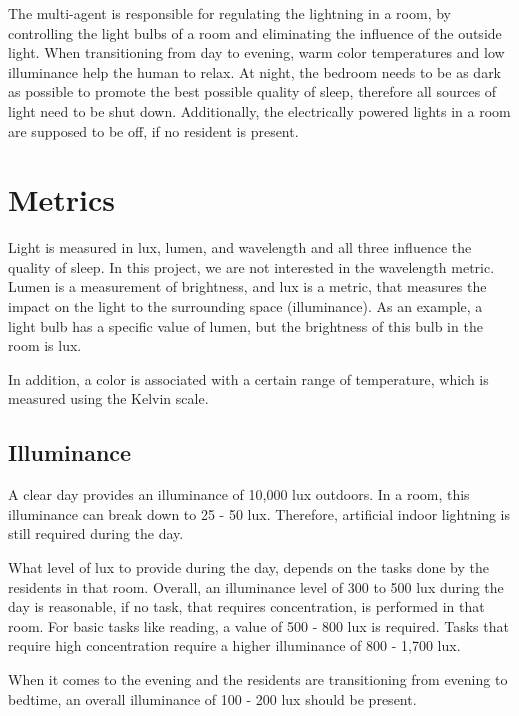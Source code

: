 \documentclass[letterpaper, 11pt]{Proposal}
\begin{document}
The multi-agent is responsible for regulating the lightning in a room, 
by controlling the light bulbs of a room 
and eliminating the influence of the outside light.
When transitioning from day to evening, warm color temperatures 
and low illuminance help the human to relax.
At night, the bedroom needs to be as dark as possible to promote
the best possible quality of sleep, therefore all sources of light
need to be shut down.
Additionally, the electrically powered lights in a room are supposed to
be off, if no resident is present.

\section{Metrics}\label{sec:02_metrics}
Light is measured in lux, lumen, and wavelength and
all three influence the quality of sleep.
In this project, we are not interested in the wavelength metric.
Lumen is a measurement of brightness, and lux is a metric,
that measures the impact on the light to the surrounding space (illuminance).
As an example, a light bulb has a specific value of lumen, 
but the brightness of this bulb in the room is lux.

In addition, a color is associated with a certain range of temperature, 
which is measured using the Kelvin scale.

\subsection{Illuminance}\label{subsec:02_metrics_illuminance}
A clear day provides an illuminance of 10,000 lux outdoors.
In a room, this illuminance can break down to 25 - 50 lux. 
Therefore, artificial indoor lightning is still required during the day.

What level of lux to provide during the day, depends on the tasks done
by the residents in that room.
Overall, an illuminance level of 300 to 500 lux during the day is reasonable,
if no task, that requires concentration, is performed in that room.
For basic tasks like reading, a value of 500 - 800 lux is required.
Tasks that require high concentration require a higher illuminance of 800 - 1,700 lux.

When it comes to the evening and the residents are transitioning from evening to bedtime,
an overall illuminance of 100 - 200 lux should be present.
\end{document}
